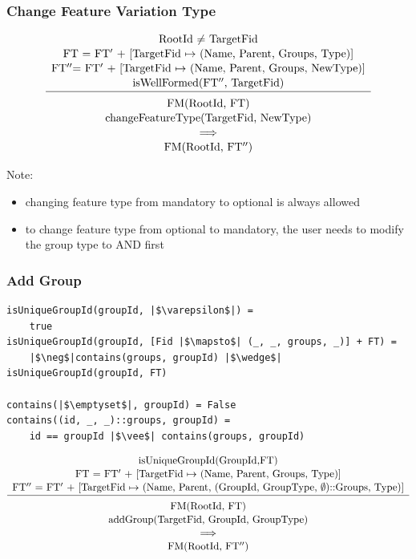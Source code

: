 \documentclass[a4paper,english]{ifimaster}
\begin{document}
\subsubsection*{Change Feature Variation Type}
\begin{equation*}
\begin{array}{c}
\text{RootId $\neq$ TargetFid} \\[1pt]
\text{FT = FT$'$ + [TargetFid $\mapsto$ (Name, Parent, Groups, Type)]} \\[1pt]
\text{FT$''$= FT$'$ + [TargetFid $\mapsto$ (Name, Parent, Groups, NewType)]} \\[1pt]
\text{isWellFormed(FT$''$, TargetFid)} \\[1pt]
\hline\\[-7pt]
\text{FM(RootId, FT)} \\[1pt]
\text{changeFeatureType(TargetFid, NewType)}  \\[1pt]
\implies \\[1pt]
\text{FM(RootId, FT$''$)}
\end{array} 
\end{equation*}

Note:
\begin{itemize}
	\item changing feature type from mandatory to optional is always allowed
	\item to change feature type from optional to mandatory, the user needs to modify the group type to AND first
\end{itemize}

\subsubsection*{Add Group}
\begin{verbatim}
isUniqueGroupId(groupId, |$\varepsilon$|) = 
    true
isUniqueGroupId(groupId, [Fid |$\mapsto$| (_, _, groups, _)] + FT) = 
    |$\neg$|contains(groups, groupId) |$\wedge$| isUniqueGroupId(groupId, FT)

contains(|$\emptyset$|, groupId) = False
contains((id, _, _)::groups, groupId) = 
    id == groupId |$\vee$| contains(groups, groupId)
\end{verbatim}

\begin{equation*}
\label{eq:rule:add-group}
\begin{array}{c}
\text{isUniqueGroupId(GroupId,FT)} 
\\[1pt]
\text{FT = FT$'$ + [TargetFid $\mapsto$ (Name, Parent, Groups, Type)]} \\[1pt]
\text{FT$''$ = FT$'$ + [TargetFid $\mapsto$ (Name, Parent, (GroupId, GroupType, $\emptyset$)::Groups, Type)]} \\[1pt]
\hline\\[-7pt]
\text{FM(RootId, FT)} \\[1pt]
\text{addGroup(TargetFid, GroupId, GroupType)}  \\[1pt]
\implies \\[1pt]
\text{FM(RootId, FT$''$)}
\end{array} 
\end{equation*}
\end{document}
